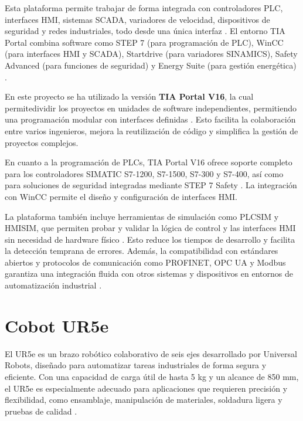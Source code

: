 Esta plataforma permite trabajar de forma integrada con controladores PLC, interfaces HMI, sistemas SCADA, variadores de velocidad, dispositivos de seguridad y redes industriales, todo desde una única interfaz \cite{TIA_portal}. El entorno TIA Portal combina software como STEP 7 (para programación de PLC), WinCC (para interfaces HMI y SCADA), Startdrive (para variadores SINAMICS), Safety Advanced (para funciones de seguridad) y Energy Suite (para gestión energética) \cite{TIA_portal}.

En este proyecto se ha utilizado la versión \textbf{TIA Portal V16}, la cual permitedividir los proyectos en unidades de software independientes, permitiendo una programación modular con interfaces definidas \cite{TIA_portal}. Esto facilita la colaboración entre varios ingenieros, mejora la reutilización de código y simplifica la gestión de proyectos complejos.

En cuanto a la programación de PLCs, TIA Portal V16 ofrece soporte completo para los controladores SIMATIC S7-1200, S7-1500, S7-300 y S7-400, así como para soluciones de seguridad integradas mediante STEP 7 Safety \cite{TIA_portal}. La integración con WinCC permite el diseño y configuración de interfaces HMI.

La plataforma también incluye herramientas de simulación como PLCSIM y HMISIM, que permiten probar y validar la lógica de control y las interfaces HMI sin necesidad de hardware físico \cite{TIA_portal}. Esto reduce los tiempos de desarrollo y facilita la detección temprana de errores. Además, la compatibilidad con estándares abiertos y protocolos de comunicación como PROFINET, OPC UA y Modbus garantiza una integración fluida con otros sistemas y dispositivos en entornos de automatización industrial \cite{TIA_portal}.

\section{Cobot UR5e}
\label{sec:ur5e}

El UR5e es un brazo robótico colaborativo de seis ejes desarrollado por Universal Robots, diseñado para automatizar tareas industriales de forma segura y eficiente. Con una capacidad de carga útil de hasta 5 kg y un alcance de 850 mm, el UR5e es especialmente adecuado para aplicaciones que requieren precisión y flexibilidad, como ensamblaje, manipulación de materiales, soldadura ligera y pruebas de calidad \cite{UR5e}.

